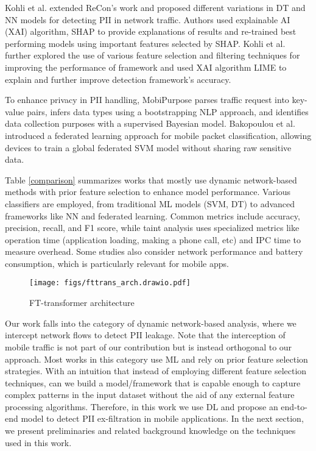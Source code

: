 Kohli et al. \cite{ants} extended ReCon's work and proposed different variations in DT and NN models for detecting PII in network traffic. Authors used explainable AI (XAI) algorithm, SHAP to provide explanations of results and re-trained best performing models using important features selected by SHAP. Kohli et al. \cite{SPCOM} further explored the use of various feature selection and filtering techniques for improving the performance of \cite{ants} framework and used XAI algorithm LIME to explain and further improve detection framework's accuracy.

To enhance privacy in PII handling, MobiPurpose \cite{mobipurpose} parses traffic request into key-value pairs, infers data types using a bootstrapping NLP approach, and identifies data collection purposes with a supervised Bayesian model. Bakopoulou et al. \cite{fedpacket} introduced a federated learning approach for mobile packet classification, allowing devices to train a global federated SVM model without sharing raw sensitive data. 

Table \ref{comparison} summarizes works that mostly use dynamic network-based methods with prior feature selection to enhance model performance. Various classifiers are employed, from traditional ML models (SVM, DT) to advanced frameworks like NN and federated learning. Common metrics include accuracy, precision, recall, and F1 score, while taint analysis uses specialized metrics like operation time (application loading, making a phone call, etc) and IPC time to measure overhead. Some studies also consider network performance and battery consumption, which is particularly relevant for mobile apps.
\begin{figure*}
    \centering
    \texttt{[image: figs/fttrans\_arch.drawio.pdf]}
    \caption{FT-transformer architecture}
    \label{ftransarc}
\end{figure*}

Our work falls into the category of dynamic network-based analysis, where we intercept network flows to detect PII leakage. Note that the interception of mobile traffic is not part of our contribution but is instead orthogonal to our approach. Most works in this category use ML and rely on prior feature selection strategies. With an intuition that instead of employing different feature selection techniques, can we build a model/framework that is capable enough to capture complex patterns in the input dataset without the aid of any external feature processing algorithms. Therefore, in this work we use DL and propose an end-to-end model to detect PII ex-filtration in mobile applications. In the next section, we present preliminaries and related background knowledge on the techniques used in this work.